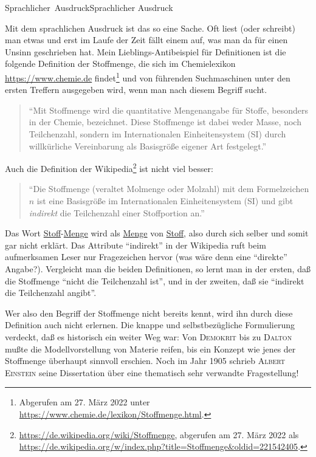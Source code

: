 

\unit{Sprachlicher Ausdruck}{Sprachlicher Ausdruck}

Mit dem sprachlichen Ausdruck ist das so eine Sache. Oft liest (oder schreibt) man etwas und
erst im Laufe der Zeit fällt einem auf, was man da für einen Unsinn geschrieben hat.
Mein Lieblings-Antibeispiel für Definitionen ist die folgende  Definition der Stoffmenge,
die sich im Chemielexikon \url{https://www.chemie.de} findet\footnote{Abgerufen am
27. März 2022 unter \href{https://www.chemie.de/lexikon/Stoffmenge.html}{https://www.chemie.de/lexikon/Stoffmenge.html}.}
und von führenden Suchmaschinen unter den ersten Treffern ausgegeben wird,
wenn man nach diesem Begriff sucht.


{
\begin{quote}
\enquote{Mit Stoffmenge wird die quantitative Mengenangabe für Stoffe, 
besonders in der Chemie, bezeichnet. 
Diese Stoffmenge ist dabei weder Masse, noch Teilchenzahl, 
sondern im Internationalen Einheitensystem (SI) durch willkürliche Vereinbarung 
als Basisgröße eigener Art festgelegt.}
\end{quote}
}

Auch die Definition der Wikipedia\footnote{\url{https://de.wikipedia.org/wiki/Stoffmenge}, abgerufen am
27. März 2022 als \url{https://de.wikipedia.org/w/index.php?title=Stoffmenge&oldid=221542405}.} ist 
nicht viel besser:

{
\begin{quote}
\enquote{Die Stoffmenge (veraltet Molmenge oder Molzahl) mit dem Formelzeichen $n$ 
ist eine Basisgröße im Internationalen Einheitensystem (SI) und gibt \textit{indirekt} 
die Teilchenzahl einer Stoffportion an.}
\end{quote}
}

Das Wort \underline{Stoff}-\underline{Menge} wird als \underline{Menge} von 
\underline{Stoff}, also durch sich selber und somit gar nicht erklärt.
Das Attribute \enquote{indirekt} in der Wikipedia ruft beim aufmerksamen Leser nur Fragezeichen 
hervor (was wäre denn eine \enquote{direkte} Angabe?). Vergleicht man die beiden Definitionen,
so lernt man in der ersten, daß die Stoffmenge \enquote{nicht die Teilchenzahl ist}, und in der zweiten,
daß sie \enquote{indirekt die Teilchenzahl angibt}.

Wer also den Begriff der Stoffmenge nicht bereits kennt, wird ihn durch diese Definition auch nicht 
 erlernen. Die knappe und selbstbezügliche Formulierung verdeckt, daß es historisch ein weiter Weg war: Von \textsc{Demokrit}
bis zu \textsc{Dalton} mußte die Modellvorstellung von Materie reifen, bis ein
Konzept wie jenes der Stoffmenge überhaupt sinnvoll erschien. Noch im Jahr 1905 schrieb 
\textsc{Albert Einstein} seine Dissertation über eine thematisch sehr verwandte Fragestellung!

